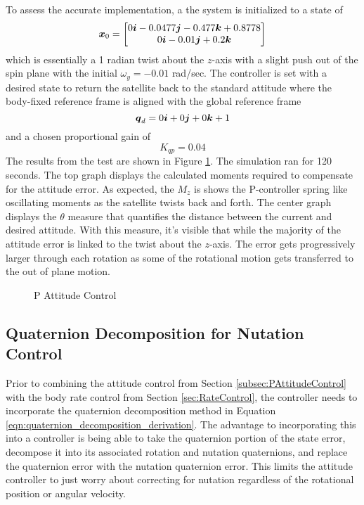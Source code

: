 To assess the accurate implementation, a the system is initialized to a state of
\begin{equation}
  \boldsymbol{x}_0 = \begin{bmatrix} 0 \boldsymbol{i} -0.0477 \boldsymbol{j} -0.477 \boldsymbol{k} +0.8778 \\ 0 \boldsymbol{i} -0.01 \boldsymbol{j} +0.2 \boldsymbol{k} \end{bmatrix}
\end{equation}
which is essentially a 1 radian twist about the $z$-axis with a slight push out of the spin plane with the initial $\omega_y = -0.01$ rad/sec.  The controller is set with a desired state to return the satellite back to the standard attitude where the body-fixed reference frame is aligned with the global reference frame
\begin{equation}
  \boldsymbol{q}_d = 0 \boldsymbol{i} +0 \boldsymbol{j} +0 \boldsymbol{k} + 1
\end{equation}
and a chosen proportional gain of
\begin{equation}
  K_{qp} = 0.04
\end{equation}
The results from the test are shown in Figure \ref{fig:PAttitudeControl}.  The simulation ran for 120 seconds.  The top graph displays the calculated moments required to compensate for the attitude error.  As expected, the $M_z$ is shows the P-controller spring like oscillating moments as the satellite twists back and forth.  The center graph displays the $\theta$ measure that quantifies the distance between the current and desired attitude.  With this measure, it's visible that while the majority of the attitude error is linked to the twist about the $z$-axis.  The error gets progressively larger through each rotation as some of the rotational motion gets transferred to the out of plane motion.
\begin{figure}[H]
  \centerline{}
  \caption{P Attitude Control}
  \label{fig:PAttitudeControl}
\end{figure}








\subsection{Quaternion Decomposition for Nutation Control}
\label{subsec:QuaternionDecompositionForNutationControl}



Prior to combining the attitude control from Section \ref{subsec:PAttitudeControl} with the body rate control from Section \ref{sec:RateControl}, the controller needs to incorporate the quaternion decomposition method in Equation \ref{eqn:quaternion_decomposition_derivation}.  The advantage to incorporating this into a controller is being able to take the quaternion portion of the state error, decompose it into its associated rotation and nutation quaternions, and replace the quaternion error with the nutation quaternion error.  This limits the attitude controller to just worry about correcting for nutation regardless of the rotational position or angular velocity.

